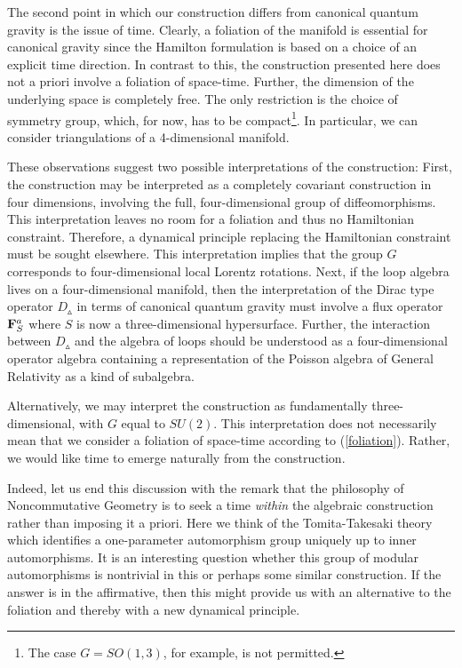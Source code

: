 \documentclass[12pt]{article}
\begin{document}
The second point in which our construction differs from canonical quantum gravity is the issue of time. Clearly, a foliation of the manifold is essential for canonical gravity since the Hamilton formulation is based on a choice of an explicit time direction.
In contrast to this, the construction presented here does not a priori involve a foliation of space-time. Further, the dimension of the underlying space is completely free. The only restriction is the choice of symmetry group, which, for now, has to be compact\footnote{The case $G=SO(1,3)$, for example, is not permitted.}. In particular, we can consider triangulations of a 4-dimensional manifold.



These observations suggest two possible interpretations of the construction:
First, the construction may be interpreted as a completely covariant construction in four dimensions, involving the full, four-dimensional group of diffeomorphisms. This interpretation leaves no room for a foliation and thus no Hamiltonian constraint. Therefore, a dynamical principle replacing the Hamiltonian constraint must be sought elsewhere. 
This interpretation implies that the group $G$ corresponds to four-dimensional local Lorentz rotations.
Next, if the loop algebra lives on a four-dimensional manifold, then the interpretation of the Dirac type operator $D_{\smalltriangleup}$ in terms of canonical quantum gravity must involve a flux operator ${\bf F}^a_S$ where $S$ is now a three-dimensional hypersurface. Further, the interaction between $D_{\smalltriangleup}$ and the algebra of loops should be understood as a four-dimensional operator algebra containing a representation of the Poisson algebra of General Relativity as a kind of subalgebra. 


Alternatively, we may interpret the construction as fundamentally three-dimensional, with $G$ equal to $SU(2)$. This interpretation does not necessarily mean that we consider a foliation of space-time according to (\ref{foliation}). Rather, we would like time to emerge naturally from the construction.



Indeed, let us end this discussion with the remark that the philosophy of Noncommutative Geometry is to seek a time {\it within} the algebraic construction rather than imposing it a priori. Here we think of the Tomita-Takesaki theory \cite{tt} which identifies a one-parameter automorphism group uniquely up to inner automorphisms. It is an interesting question whether this group of modular automorphisms is nontrivial in this or perhaps some similar construction. If the answer is in the affirmative, then this might provide us with an alternative to the foliation and thereby with a new dynamical principle.
\end{document}
